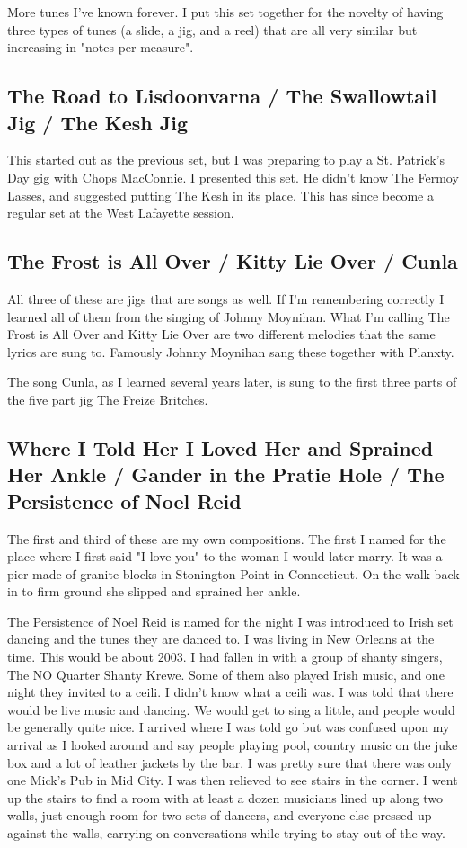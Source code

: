\documentclass[9pt,letterpaper]{article}
\begin{document}
{More tunes I've known forever. I put this set together for the novelty of having three types of tunes (a slide, a jig, and a reel) that are all very similar but increasing in "notes per measure".

\subsection{The Road to Lisdoonvarna / The Swallowtail Jig / The Kesh Jig}

This started out as the previous set, but I was preparing to play a St. Patrick's Day gig with Chops MacConnie. I presented this set. He didn't know The Fermoy Lasses, and suggested putting The Kesh in its place. This has since become a regular set at the West Lafayette session.

\subsection{The Frost is All Over / Kitty Lie Over / Cunla}

All three of these are jigs that are songs as well. If I'm remembering correctly I learned all of them from the singing of Johnny Moynihan. What I'm calling The Frost is All Over and Kitty Lie Over are two different melodies that the same lyrics are sung to. Famously Johnny Moynihan sang these together with Planxty.

The song Cunla, as I learned several years later, is sung to the first three parts of the five part jig The Freize Britches.

\subsection{Where I Told Her I Loved Her and Sprained Her Ankle / Gander in the Pratie Hole / The Persistence of Noel Reid}

The first and third of these are my own compositions. The first I named for the place where I first said "I love you" to the woman I would later marry. It was a pier made of granite blocks in Stonington Point in Connecticut. On the walk back in to firm ground she slipped and sprained her ankle.

The Persistence of Noel Reid is named for the night I was introduced to Irish set dancing and the tunes they are danced to. I was living in New Orleans at the time. This would be about 2003. I had fallen in with a group of shanty singers, The NO Quarter Shanty Krewe. Some of them also played Irish music, and one night they invited to a ceili. I didn't know what a ceili was. I was told that there would be live music and dancing. We would get to sing a little, and people would be generally quite nice.
I arrived where I was told go but was confused upon my arrival as I looked around and say people playing pool, country music on the juke box and a lot of leather jackets by the bar. I was pretty sure that there was only one Mick's Pub in Mid City. I was then relieved to see stairs in the corner. I went up the stairs to find a room with at least a dozen musicians lined up along two walls, just enough room for two sets of dancers, and everyone else pressed up against the walls, carrying on conversations while trying to stay out of the way.

}
\end{document}
